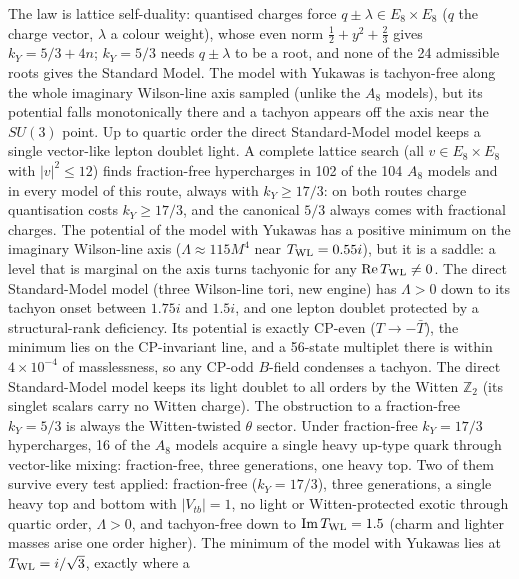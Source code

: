The law is lattice self-duality: quantised charges force $q\pm\lambda\in E_8\times E_8$ ($q$ the charge vector, $\lambda$ a colour
weight), whose even norm $\tfrac12+y^2+\tfrac23$ gives $k_Y=5/3+4n$; $k_Y=5/3$ needs $q\pm\lambda$ to be a root, and none of the
24 admissible roots gives the Standard Model. The model with Yukawas is tachyon-free along the whole imaginary Wilson-line
axis sampled (unlike the $A_8$ models), but its potential falls monotonically there and a tachyon appears off the axis near
the $SU(3)$ point. Up to quartic order the direct Standard-Model model keeps a single vector-like lepton doublet light. 
A complete lattice search (all $v\in E_8\times E_8$ with $|v|^2\le 12$) finds fraction-free hypercharges in 102 of the 104 $A_8$ models
and in every model of this route, always with $k_Y\ge 17/3$: on both routes charge quantisation costs $k_Y\ge 17/3$, and the
canonical $5/3$ always comes with fractional charges. The potential of the model with Yukawas has a positive minimum on the
imaginary Wilson-line axis ($\Lambda\approx 115M^4$ near $T_{\rm WL}=0.55i$), but it is a saddle: a level that is marginal on the axis turns
tachyonic for any $\mathrm{Re}\,T_{\rm WL}\ne0$. The direct Standard-Model model (three Wilson-line tori, new engine) has $\Lambda>0$
down to its tachyon onset between $1.75i$ and $1.5i$, and one lepton doublet protected by a structural-rank deficiency. 
Its potential is exactly CP-even ($T\to-\bar T$), the minimum lies on the CP-invariant line, and a 56-state multiplet there is within
$4\times10^{-4}$ of masslessness, so any CP-odd $B$-field condenses a tachyon. The direct Standard-Model model keeps its light
doublet to all orders by the Witten $\mathbb Z_2$ (its singlet scalars carry no Witten charge). The obstruction to a fraction-free
$k_Y=5/3$ is always the Witten-twisted $\theta$ sector. Under fraction-free $k_Y=17/3$ hypercharges, 16 of the $A_8$ models acquire a
single heavy up-type quark through vector-like mixing: fraction-free, three generations, one heavy top. 
Two of them survive every test applied: fraction-free ($k_Y=17/3$), three generations, a single heavy top and bottom with
$|V_{tb}|=1$, no light or Witten-protected exotic through quartic order, $\Lambda>0$, and tachyon-free down to $\mathrm{Im}\,T_{\rm WL}=1.5$
(charm and lighter masses arise one order higher). The minimum of the model with Yukawas lies at $T_{\rm WL}=i/\sqrt3$, exactly where a
